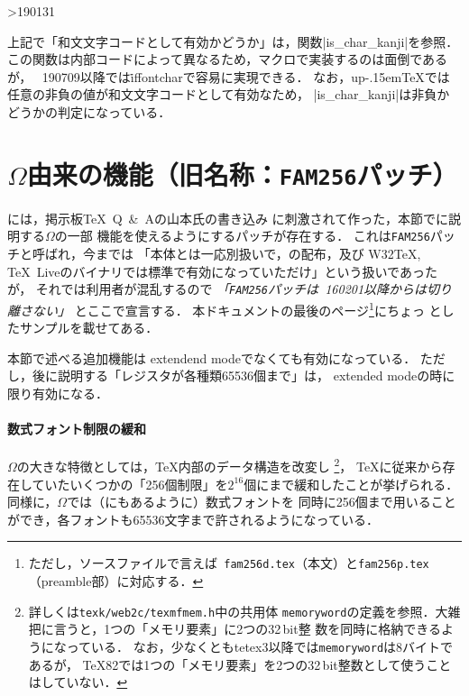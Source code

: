 \documentclass[a4paper,11pt,nomag]{jsarticle}
\newcommand{\OMEGA}{$\Omega$}
\def\upTeX{u\pTeX}\def\pTeX{p\kern-.15em\TeX}
\begin{document}
\ifnum\epTeXversion>190131 %
\begin{dangerous}
  上記で「和文文字コードとして有効かどうか」は，関数|is_char_kanji|を参照．
  この関数は内部コードによって異なるため，マクロで実装するのは面倒であるが，
  \epTeX~190709以降では\.{iffontchar}で容易に実現できる．
  なお，\upTeX では任意の非負の値が和文文字コードとして有効なため，
  |is_char_kanji|は非負かどうかの判定になっている．
\end{dangerous}
\fi %

\section{\OMEGA 由来の機能（旧名称：\texttt{FAM256}パッチ）}
\epTeX には，掲示板\TeX\ Q\ \&\ Aの山本氏の書き込み
\cite{yamamoto}に刺激されて作った，本節でに説明する\OMEGA の一部
機能を使えるようにするパッチが存在する．
これは\texttt{FAM256}パッチと呼ばれ，今までは
「\epTeX 本体とは一応別扱いで，\epTeX の配布，及び
W32\TeX, \TeX~Liveのバイナリでは標準で有効になっていただけ」という扱いであったが，
それでは利用者が混乱するので
\emph{「\texttt{FAM256}パッチは\epTeX~160201以降からは切り離さない」}
とここで宣言する．
本ドキュメントの最後のページ\footnote{ただし，ソースファイルで言えば{\tt
fam256d.tex}（本文）と\texttt{fam256p.tex}（preamble部）に対応する．}にちょっ
としたサンプルを載せてある．

本節で述べる追加機能は extendend modeでなくても有効になっている．
ただし，後に説明する「レジスタが各種類65536個まで」は，
extended modeの時に限り有効になる．

\paragraph{数式フォント制限の緩和}
\OMEGA の大きな特徴としては，\TeX 内部のデータ構造を改変し
\footnote{詳しくは\texttt{texk/web2c/texmfmem.h}中の共用体%
\texttt{memoryword}の定義を参照．大雑把に言うと，1つの「メモリ要素」に2つの32\,bit整
数を同時に格納できるようになっている．
なお，少なくともtetex3以降では\texttt{memoryword}は8バイトであるが，
\TeX 82では1つの「メモリ要素」を2つの32\,bit整数として使うことはしていない．
}，
\TeX に従来から存在していたいくつかの「256個制限」を$2^{16}$個にまで緩和したことが挙げられる．
同様に，\OMEGA では（\cite{yamamoto}にもあるように）数式フォントを
同時に256個まで用いることができ，各フォントも65536文字まで許されるようになっている．
\end{document}
